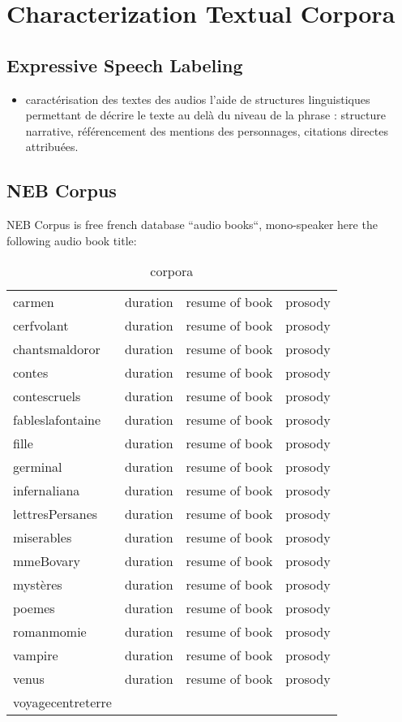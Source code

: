 \chapter{Characterization Textual Corpora }

\section{Expressive Speech Labeling}
\begin{itemize}
\item caractérisation des textes des audios l’aide de structures linguistiques
permettant de décrire le texte au delà du niveau de la phrase : structure narrative, référencement
des mentions des personnages, citations directes attribuées.
\end{itemize}

\section{NEB Corpus}
NEB Corpus is free french database ``audio books``, mono-speaker here the following audio book title:


\begin{table}[h]
   \caption{\label{<corpora>} corpora}
   \begin{tabular}{|l|c|c|c|}
carmen& duration & resume of book & prosody\\
cerfvolant& duration & resume of book & prosody\\
chantsmaldoror&duration & resume of book & prosody \\
contes&duration & resume of book & prosody \\
contescruels& duration & resume of book & prosody\\
fableslafontaine& duration & resume of book & prosody\\
fille& duration & resume of book & prosody\\
germinal& duration & resume of book & prosody\\
infernaliana& duration & resume of book & prosody\\
lettresPersanes& duration & resume of book & prosody\\
miserables & duration & resume of book & prosody\\
mmeBovary& duration & resume of book & prosody\\
mystères& duration & resume of book & prosody\\
poemes& duration & resume of book & prosody\\
romanmomie& duration & resume of book & prosody\\
vampire& duration & resume of book & prosody\\
venus& duration & resume of book & prosody\\
voyagecentreterre& \\
   \end{tabular}
\end{table}

